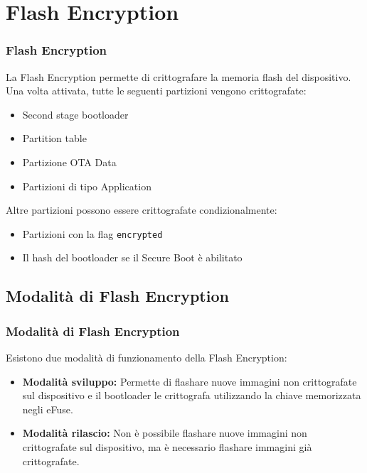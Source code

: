 \documentclass{beamer}
\begin{document}
\section{Flash Encryption}
\begin{frame}
\frametitle{Flash Encryption}
La Flash Encryption permette di crittografare la memoria flash del dispositivo. 
Una volta attivata, tutte le seguenti partizioni vengono crittografate:
\begin{itemize}
  \item Second stage bootloader
  \item Partition table
  \item Partizione OTA Data
  \item Partizioni di tipo Application
\end{itemize}
Altre partizioni possono essere crittografate condizionalmente:
\begin{itemize}
  \item Partizioni con la flag \texttt{encrypted}
  \item Il hash del bootloader se il Secure Boot è abilitato
\end{itemize}
\end{frame}

\subsection{Modalità di Flash Encryption}
\begin{frame}
\frametitle{Modalità di Flash Encryption}
Esistono due modalità di funzionamento della Flash Encryption:
\begin{itemize}
  \item \textbf{Modalità sviluppo:} Permette di flashare nuove immagini non crittografate
    sul dispositivo e il bootloader le crittografa utilizzando la chiave memorizzata
    negli eFuse.

  \item \textbf{Modalità rilascio:} Non è possibile flashare nuove immagini non crittografate
    sul dispositivo, ma è necessario flashare immagini già crittografate.
\end{itemize}
\end{frame}
\end{document}

